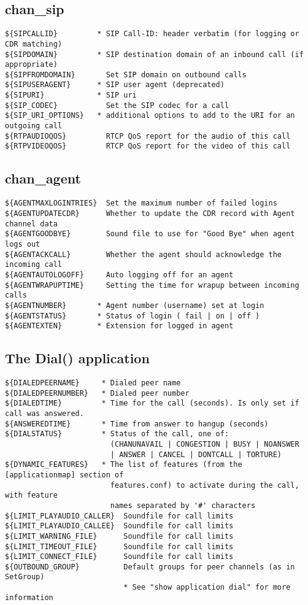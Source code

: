 \subsection{chan\_sip}
\begin{verbatim}
${SIPCALLID}         * SIP Call-ID: header verbatim (for logging or CDR matching)
${SIPDOMAIN}         * SIP destination domain of an inbound call (if appropriate)
${SIPFROMDOMAIN}       Set SIP domain on outbound calls
${SIPUSERAGENT}      * SIP user agent (deprecated)
${SIPURI}            * SIP uri
${SIP_CODEC}           Set the SIP codec for a call
${SIP_URI_OPTIONS}   * additional options to add to the URI for an outgoing call
${RTPAUDIOQOS}         RTCP QoS report for the audio of this call
${RTPVIDEOQOS}         RTCP QoS report for the video of this call
\end{verbatim}

\subsection{chan\_agent}
\begin{verbatim}
${AGENTMAXLOGINTRIES}  Set the maximum number of failed logins
${AGENTUPDATECDR}      Whether to update the CDR record with Agent channel data
${AGENTGOODBYE}        Sound file to use for "Good Bye" when agent logs out
${AGENTACKCALL}        Whether the agent should acknowledge the incoming call
${AGENTAUTOLOGOFF}     Auto logging off for an agent
${AGENTWRAPUPTIME}     Setting the time for wrapup between incoming calls
${AGENTNUMBER}       * Agent number (username) set at login
${AGENTSTATUS}       * Status of login ( fail | on | off )
${AGENTEXTEN}        * Extension for logged in agent
\end{verbatim}


\subsection{The Dial() application}
\begin{verbatim}
${DIALEDPEERNAME}     * Dialed peer name
${DIALEDPEERNUMBER}   * Dialed peer number
${DIALEDTIME}         * Time for the call (seconds). Is only set if call was answered.
${ANSWEREDTIME}       * Time from answer to hangup (seconds)
${DIALSTATUS}         * Status of the call, one of:
                        (CHANUNAVAIL | CONGESTION | BUSY | NOANSWER
                        | ANSWER | CANCEL | DONTCALL | TORTURE)
${DYNAMIC_FEATURES}   * The list of features (from the [applicationmap] section of
                        features.conf) to activate during the call, with feature
                        names separated by '#' characters
${LIMIT_PLAYAUDIO_CALLER}  Soundfile for call limits
${LIMIT_PLAYAUDIO_CALLEE}  Soundfile for call limits
${LIMIT_WARNING_FILE}      Soundfile for call limits
${LIMIT_TIMEOUT_FILE}      Soundfile for call limits
${LIMIT_CONNECT_FILE}      Soundfile for call limits
${OUTBOUND_GROUP}          Default groups for peer channels (as in SetGroup)
                           * See "show application dial" for more information
\end{verbatim}

